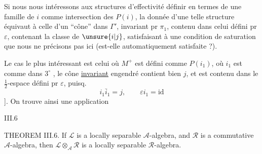 Si nous nous intéressons aux structures d'effectivité  définir  en termes de  une famille de \uline{$i$} comme intersection des $P(i)$,  la donnée d'une telle structure équivaut à celle d'un ``cône'' dans $\Gamma'$, invariant pr $\pi_1$, contenu  dans celui défini pr $\varepsilon$, contenant la classe de $\unsure{i|j}$, satisfaisant à une condition de  saturation que nous ne précisons pas ici (est-elle automatiquement satisfaite ?).


Le cas le plus intéressant est celui où $M^+$  est défini comme $P(i_1)$, où $i_1$ est comme dans $3^\circ$ \deleted{[\unsure{en fait bien}}, \inserted{[N.B.} le cône \uline{invariant} engendré contient bien $j$, et est contenu dans le $\frac12$-espace défini pr $\varepsilon$, puisq.
\[
i_1\bar i_1=j,\qquad \varepsilon i_1=\mathrm{id}
\]
]. On trouve ainsi une application



III.6

THEOREM III.6. If $\mathcal{L}$ is a locally separable $\mathcal{A}$-algebra, and $\mathcal{R}$ is a commutative $\mathcal{A}$-algebra, then $\mathcal{L}\otimes_{\mathcal{A}}\mathcal{R}$ is a locally separable $\mathcal{R}$-algebra.

